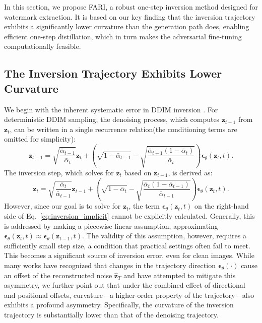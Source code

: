 \documentclass{article}
\begin{document}
In this section, we propose FARI, a robust one-step inversion method designed for watermark extraction. It is based on our key finding that the inversion trajectory exhibits a significantly lower curvature than the generation path does, enabling efficient one-step distillation, which in turn makes the adversarial fine-tuning computationally feasible.

\subsection{The Inversion Trajectory Exhibits Lower Curvature}
\label{sec:motivation}

We begin with the inherent systematic error in DDIM inversion \citep{ddim_2021}. For deterministic DDIM sampling, the denoising process, which computes $\boldsymbol{z}_{t-1}$ from $\boldsymbol{z}_t$, can be written in a single recurrence relation(the conditioning terms are omitted for simplicity):
\begin{equation}
    \boldsymbol{z}_{t-1} = \sqrt{\frac{\bar{\alpha}_{t-1}}{\bar{\alpha}_t}} \boldsymbol{z}_t + \left( \sqrt{1 - \bar{\alpha}_{t-1}} - \sqrt{\frac{\bar{\alpha}_{t-1}(1-\bar{\alpha}_t)}{\bar{\alpha}_t}} \right) \boldsymbol{\epsilon}_\theta(\boldsymbol{z}_t, t).
    \label{eq:denoising}
\end{equation}
The inversion step, which solves for $\boldsymbol{z}_t$ based on $\boldsymbol{z}_{t-1}$, is derived as:
\begin{equation}
    \boldsymbol{z}_t = \sqrt{\frac{\bar{\alpha}_t}{\bar{\alpha}_{t-1}}} \boldsymbol{z}_{t-1} + \left( \sqrt{1-\bar{\alpha}_t} - \sqrt{\frac{\bar{\alpha}_t(1 - \bar{\alpha}_{t-1})}{\bar{\alpha}_{t-1}}} \right) \boldsymbol{\epsilon}_\theta(\boldsymbol{z}_t, t).
    \label{eq:inversion_implicit}
\end{equation}
However, since our goal is to solve for $\boldsymbol{z}_t$, the term $\boldsymbol{\epsilon}_\theta(\boldsymbol{z}_t, t)$ on the right-hand side of Eq.~\ref{eq:inversion_implicit} cannot be explicitly calculated. Generally, this is addressed by making a piecewise linear assumption, approximating $\boldsymbol{\epsilon}_\theta(\boldsymbol{z}_t, t) \approx \boldsymbol{\epsilon}_\theta(\boldsymbol{z}_{t-1}, t)$. The validity of this assumption, however, requires a sufficiently small step size, a condition that practical settings often fail to meet. This becomes a significant source of inversion error, even for clean images. While many works \citep{schedule2024, belm2024, there2024} have recognized that changes in the trajectory direction $\boldsymbol{\epsilon}_\theta(\cdot)$ cause an offset of the reconstructed noise $\hat{\boldsymbol{z}}_T$ and have attempted to mitigate this asymmetry, we further point out that under the combined effect of directional and positional offsets, curvature---a higher-order property of the trajectory---also exhibits a profound asymmetry. Specifically, the curvature of the inversion trajectory is substantially lower than that of the denoising trajectory.
\end{document}
